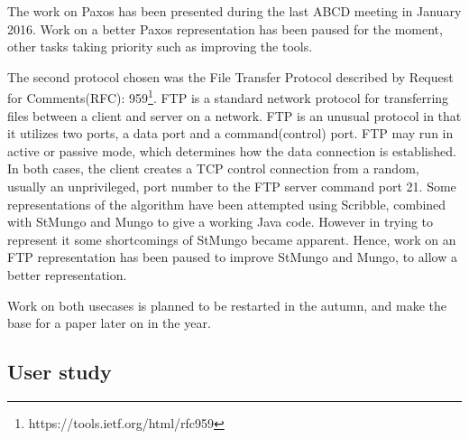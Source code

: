 The work on Paxos has been presented during the last ABCD meeting in January 2016. Work on a better Paxos representation has been paused for the moment, other tasks taking priority such as improving the tools.


The second protocol chosen was the File Transfer Protocol described by Request for Comments(RFC): 959\footnote{https://tools.ietf.org/html/rfc959}. FTP is a standard network protocol for transferring  files between a client and server on a network.  FTP is an unusual protocol in that it utilizes two ports, a data port and a command(control) port. FTP may run in active or passive mode, which determines how the data connection is established. In both cases, the client creates a TCP control connection from a random, usually an unprivileged, port number to the FTP server command port 21.
%
%
Some representations of the algorithm have been attempted using Scribble, combined with StMungo and Mungo to give a working Java code. However in trying to represent it some shortcomings of StMungo became apparent. Hence, work on an FTP representation has been paused to improve StMungo and Mungo, to allow a better representation. 

Work on both usecases is planned to be restarted in the autumn, and make the base for a paper later on in the year. 

\subsection{User study}
\label{us}




